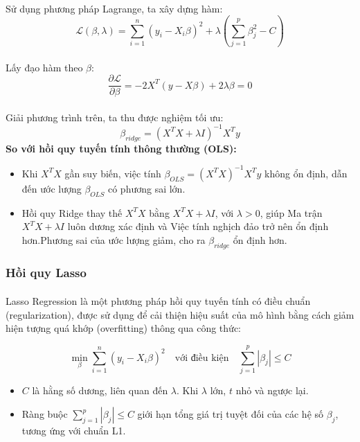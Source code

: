 \paragraph{}{Sử dụng phương pháp Lagrange, ta xây dựng hàm:}
\[
\mathcal{L}(\beta, \lambda) = \sum_{i=1}^{n} (y_i - X_i\beta)^2 + \lambda \left( \sum_{j=1}^{p} \beta_j^2 - C \right)
\]
\paragraph{}{Lấy đạo hàm theo \( \beta \):}
\[
\frac{\partial \mathcal{L}}{\partial \beta} = -2X^T(y - X\beta) + 2\lambda \beta = 0
\]
\paragraph{}{Giải phương trình trên, ta thu được nghiệm tối ưu:}
\[
\beta_{ridge} = (X^TX + \lambda I)^{-1} X^Ty
\]
\textbf{So với hồi quy tuyến tính thông thường (OLS):}

\begin{itemize}
\item{Khi $X^TX$ gần suy biến, việc tính $\beta_{OLS} = (X^TX)^{-1} X^Ty$ không ổn định, dẫn đến ước lượng $\beta_{OLS}$ có phương sai lớn.}

\item Hồi quy Ridge thay thế $X^TX$ bằng $X^TX + \lambda I$, với $\lambda > 0$, giúp Ma trận $X^TX + \lambda I$ luôn dương xác định và Việc tính nghịch đảo trở nên ổn định hơn.Phương sai của ước lượng giảm, cho ra $\beta_{ridge}$ ổn định hơn.
\end{itemize}
\subsubsection{Hồi quy Lasso}
\label{label:lasso-math}
\paragraph{}{Lasso Regression \cite{stackexchange-lasso} là một phương pháp hồi quy tuyến tính có điều chuẩn (regularization), được sử dụng để cải thiện hiệu suất của mô hình bằng cách giảm hiện tượng quá khớp (overfitting) thông qua công thức:}

\begin{equation} \label{eq:lasso}
    \min_{\beta} \sum_{i=1}^{n} (y_i - X_i\beta)^2 \quad \text{với điều kiện} \quad \sum_{j=1}^{p} |\beta_j| \leq C
\end{equation}

\begin{itemize}
    \item $C$ là hằng số dương, liên quan đến $\lambda$. Khi $\lambda$ lớn, $t$ nhỏ và ngược lại.
    \item Ràng buộc $\sum_{j=1}^p |\beta_j| \le C$ giới hạn tổng giá trị tuyệt đối của các hệ số $\beta_{j}$, tương ứng với chuẩn L1.
\end{itemize}

